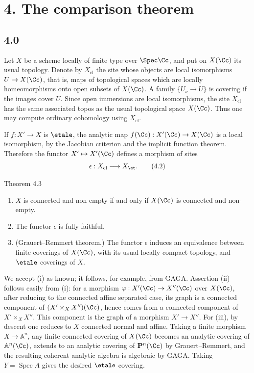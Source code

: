 \section*{4. The comparison theorem}

\subsection*{4.0}
Let \(X\) be a scheme locally of finite type over \(\Spec\Cc\), and put on \(X(\Cc)\) its usual topology. Denote by \(X_{\mathrm{cl}}\) the site whose objects are local isomorphisms \(U\to X(\Cc)\), that is, maps of topological spaces which are locally homeomorphisms onto open subsets of \(X(\Cc)\). A family \(\{U_\nu\to U\}\) is covering if the images cover \(U\). Since open immersions are local isomorphisms, the site \(X_{\mathrm{cl}}\) has the same associated topos as the usual topological space \(X(\Cc)\). Thus one may compute ordinary cohomology using \(X_{\mathrm{cl}}\).

If \(f:X'\to X\) is \(\etale\), the analytic map \(f(\Cc):X'(\Cc)\to X(\Cc)\) is a local isomorphism, by the Jacobian criterion and the implicit function theorem. Therefore the functor \(X'\mapsto X'(\Cc)\) defines a morphism of sites
\[
\epsilon:X_{\mathrm{cl}}\longrightarrow X_{\et}.
\tag{4.2}
\]

\begin{statement}{Theorem 4.3}
\begin{enumerate}[label=(\roman*)]
\item \(X\) is connected and non-empty if and only if \(X(\Cc)\) is connected and non-empty.
\item The functor \(\epsilon\) is fully faithful.
\item (Grauert--Remmert theorem.) The functor \(\epsilon\) induces an equivalence between finite coverings of \(X(\Cc)\), with its usual locally compact topology, and \(\etale\) coverings of \(X\).
\end{enumerate}
\end{statement}

We accept (i) as known; it follows, for example, from GAGA. Assertion (ii) follows easily from (i): for a morphism \(\varphi:X'(\Cc)\to X''(\Cc)\) over \(X(\Cc)\), after reducing to the connected affine separated case, its graph is a connected component of \((X'\times_XX'')(\Cc)\), hence comes from a connected component of \(X'\times_XX''\). This component is the graph of a morphism \(X'\to X''\). For (iii), by descent one reduces to \(X\) connected normal and affine. Taking a finite morphism \(X\to\mathbb A^n\), any finite connected covering of \(X(\Cc)\) becomes an analytic covering of \(\mathbb A^n(\Cc)\), extends to an analytic covering of \(\mathbf P^n(\Cc)\) by Grauert--Remmert, and the resulting coherent analytic algebra is algebraic by GAGA. Taking \(Y=\operatorname{Spec}A\) gives the desired \(\etale\) covering.

